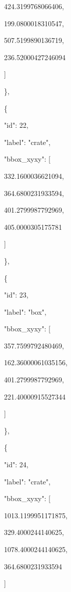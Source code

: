 \documentclass[10pt,a4paper]{article}
\begin{document}
        424.3199768066406,\allowbreak{}\par
        199.0800018310547,\allowbreak{}\par
        507.5199890136719,\allowbreak{}\par
        236.52000427246094\par
      ]\par
    \},\allowbreak{}\par
    \{\par
      "id":\allowbreak{} 22,\allowbreak{}\par
      "label":\allowbreak{} "crate",\allowbreak{}\par
      "bbox\_xyxy":\allowbreak{} [\par
        332.1600036621094,\allowbreak{}\par
        364.6800231933594,\allowbreak{}\par
        401.2799987792969,\allowbreak{}\par
        405.0000305175781\par
      ]\par
    \},\allowbreak{}\par
    \{\par
      "id":\allowbreak{} 23,\allowbreak{}\par
      "label":\allowbreak{} "box",\allowbreak{}\par
      "bbox\_xyxy":\allowbreak{} [\par
        357.7599792480469,\allowbreak{}\par
        162.36000061035156,\allowbreak{}\par
        401.2799987792969,\allowbreak{}\par
        221.40000915527344\par
      ]\par
    \},\allowbreak{}\par
    \{\par
      "id":\allowbreak{} 24,\allowbreak{}\par
      "label":\allowbreak{} "crate",\allowbreak{}\par
      "bbox\_xyxy":\allowbreak{} [\par
        1013.1199951171875,\allowbreak{}\par
        329.4000244140625,\allowbreak{}\par
        1078.4000244140625,\allowbreak{}\par
        364.6800231933594\par
      ]\par
\end{document}
